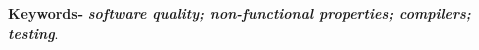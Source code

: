 \smallskip
\noindent \textbf{Keywords-} \textbf{\textit{software quality; non-functional properties; compilers; testing}}.



